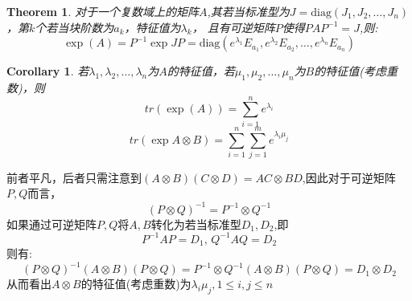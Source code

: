 \documentclass[a4paper,12pt]{ctexart}
\newenvironment{prooff}{{\noindent\it\textcolor{cyan!40!black}{Proof}:}\quad}{\par}
\newtheorem{coro}[defn]{Corollary}
\newtheorem{theo}[defn]{Theorem}
\begin{document}
\begin{theo}
    \label{theo:expression of exp(A)}
    对于一个复数域上的矩阵$A$,其若当标准型为$J=\text{diag}(J_1,J_2,\dots,J_n)$，第$k$个若当块阶数为$a_k$，特征值为$\lambda_k$，
    且有可逆矩阵$P$使得$PAP^{-1}=J$,则:
    \begin{equation*}
        \exp(A)=P^{-1}\exp{J}P=\text{diag}(e^{\lambda_1}E_{a_1},e^{\lambda_2}E_{a_2},\dots,e^{\lambda_n}E_{a_n})
    \end{equation*}
\end{theo}
\begin{coro}
    若$\lambda_1,\lambda_2,\dots,\lambda_n$为$A$的特征值，若$\mu_1,\mu_2,\dots,\mu_n$为$B$的特征值(考虑重数)，则
    \begin{equation*}
        tr(\exp(A))=\sum_{i=1}^{n}e^{\lambda_i}
    \end{equation*}
    \begin{equation*}
        tr(\exp{A\otimes B})=\sum_{i=1}^{n}\sum_{j=1}^{m}e^{\lambda_i\mu_j}
    \end{equation*}
\end{coro}
\begin{prooff}
    前者平凡，后者只需注意到$(A\otimes B)(C\otimes D)=AC\otimes BD$,因此对于可逆矩阵$P,Q$而言，
    \begin{equation*}
        (P\otimes Q)^{-1}=P^{-1}\otimes Q^{-1}
    \end{equation*}
    如果通过可逆矩阵$P,Q$将$A,B$转化为若当标准型$D_1,D_2$,即
    \begin{equation*}
        P^{-1}AP=D_1,\, Q^{-1}AQ=D_2
    \end{equation*}
    则有:
    \begin{equation*}
        (P\otimes Q)^{-1}(A\otimes B) (P\otimes Q)= P^{-1}\otimes Q^{-1}(A\otimes B) (P\otimes Q)=D_1\otimes D_2
    \end{equation*}
    从而看出$A\otimes B$的特征值(考虑重数)为$\lambda_i\mu_j,1\le i,j\le n$
\end{prooff}
\end{document}
